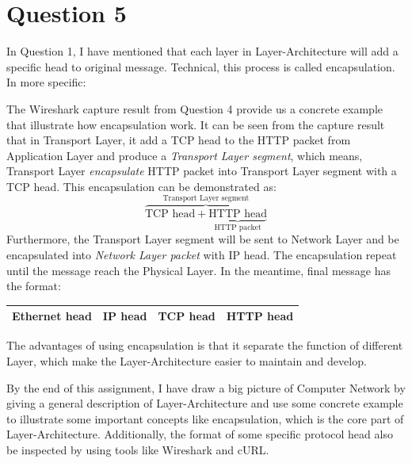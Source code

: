 \documentclass[10pt,a4paper]{article}
\begin{document}
\section*{Question 5}
In Question 1, I have mentioned that each layer in Layer-Architecture will add a specific head to original message. Technical, this process is called encapsulation. In more specific:
\begin{center}
	\begin{tcolorbox}[colback = lightgray, width = 0.75\textwidth]
	\end{tcolorbox}
\end{center}
The Wireshark capture result from Question 4 provide us a concrete example that illustrate how encapsulation work. It can be seen from the capture result that in Transport Layer, it add a TCP head to the HTTP packet from Application Layer and produce a \textit{Transport Layer segment}, which means, Transport Layer \textit{encapsulate} HTTP packet into Transport Layer segment with a TCP head. This encapsulation can be demonstrated as:
\begin{equation*}
	\overbrace{\boxed{\text{TCP head}} + \underbrace{\boxed{\text{HTTP head}}}_{\text{HTTP packet}}}^{\text{Transport Layer segment}}
\end{equation*}
Furthermore, the Transport Layer segment will be sent to Network Layer and be encapsulated into \textit{Network Layer packet} with IP head. The encapsulation repeat until the message reach the Physical Layer. In the meantime, final message has the format:
\begin{center}
	\begin{tabular}{|c|c|c|c|}
		\hline
		Ethernet head & IP head & TCP head & HTTP head\\
		\hline
	\end{tabular}
\end{center}
The advantages of using encapsulation is that it separate the function of different Layer, which make the Layer-Architecture easier to maintain and develop. 

By the end of this assignment, I have draw a big picture of Computer Network by giving a general description of Layer-Architecture and use some concrete example to illustrate some important concepts like encapsulation, which is the core part of Layer-Architecture. Additionally, the format of some specific protocol head also be inspected by using tools like Wireshark and cURL.



\end{document}
